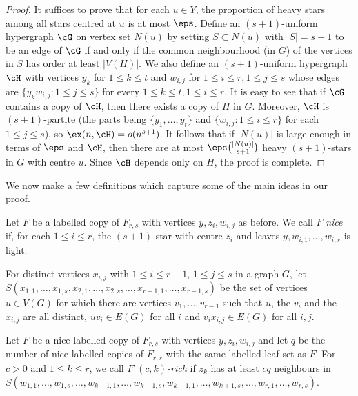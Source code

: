 \begin{proof}
	It suffices to prove that for each $u\in Y$, the proportion of heavy stars among all stars centred at $u$ is at most $\eps$. Define an $(s+1)$-uniform hypergraph $\cG$ on vertex set $N(u)$ by setting $S\subset N(u)$ with $|S| = s+1$ to be an edge of $\cG$ if and only if the common neighbourhood (in $G$) of the vertices in $S$ has order at least $|V(H)|$. We also define an $(s+1)$-uniform hypergraph $\cH$ with vertices $y_k$ for $1\leq k\leq t$ and $w_{i,j}$ for $1\leq i\leq r,1\leq j\leq s$ whose edges are $\{y_kw_{i,j}: 1\leq j\leq s\}$ for every $1\leq k\leq t,1\leq i\leq r$. It is easy to see that if $\cG$ contains a copy of $\cH$, then there exists a copy of $H$ in $G$. Moreover, $\cH$ is $(s+1)$-partite (the parts being $\{y_1,\dots,y_t\}$ and $\{w_{i,j}:1\leq i\leq r\}$ for each $1\leq j\leq s$), so $\ex(n,\cH)=o(n^{s+1})$. It follows that if $|N(u)|$ is large enough in terms of $\eps$ and $\cH$, then there are at most $\eps \binom{|N(u)|}{s+1}$ heavy $(s+1)$-stars in $G$ with centre $u$. Since $\cH$ depends only on $H$, the proof is complete.
\end{proof}

We now make a few definitions which capture some of the main ideas in our proof.

\begin{definition}
	Let $F$ be a labelled copy of $F_{r,s}$ with vertices $y,z_i,w_{i,j}$ as before. We call $F$ \emph{nice} if, for each $1\leq i\leq r$, the $(s+1)$-star with centre $z_i$ and leaves $y,w_{i,1},\dots,w_{i,s}$ is light.
\end{definition}

\begin{definition} \label{def:locus}
	\sloppy For distinct vertices $x_{i,j}$ with $1\leq i\leq r-1$, $1\leq j\leq s$ in a graph $G$, let $S(x_{1,1},\dots,x_{1,s},x_{2,1},\dots,x_{2,s},\dots,x_{r-1,1},\dots,x_{r-1,s})$ be the set of vertices $u\in V(G)$ for which there are vertices $v_1,\dots,v_{r-1}$ such that $u$, the $v_i$ and the $x_{i,j}$ are all distinct, $uv_i\in E(G)$ for all $i$ and $v_ix_{i,j}\in E(G)$ for all $i,j$.
\end{definition}

\begin{definition}
	\sloppy Let $F$ be a nice labelled copy of $F_{r,s}$ with vertices $y,z_i,w_{i,j}$ and let $q$ be the number of nice labelled copies of $F_{r,s}$ with the same labelled leaf set as $F$. For $c>0$ and $1\leq k\leq r$, we call $F$ \emph{$(c,k)$-rich} if $z_k$ has at least $cq$ neighbours in $S(w_{1,1},\dots,w_{1,s},\dots,w_{k-1,1},\dots,w_{k-1,s},w_{k+1,1},\dots,w_{k+1,s},\dots,w_{r,1},\dots,w_{r,s})$.
\end{definition}

